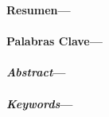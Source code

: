 \newpage
{}
\vspace{0.3cm}
\noindent \textbf{Resumen---}\resumen \ \\
\vspace{0.3cm} \\
\noindent \textbf{Palabras Clave---}\palabrasclave \ \\
\vspace{1.2cm} \\
\vspace{0.3cm}
\noindent \textbf{\emph{Abstract}---}\resumeningles \ \\
\vspace{0.3cm} \\
\noindent \textbf{\emph{Keywords}---}\palabrasclaveingles \ \\
